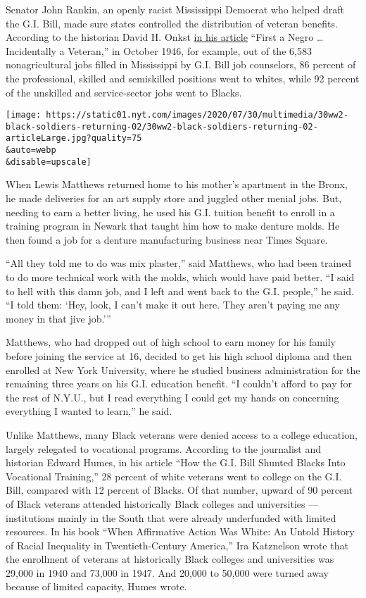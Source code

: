 Senator John Rankin, an openly racist Mississippi Democrat who helped
draft the G.I. Bill, made sure states controlled the distribution of
veteran benefits. According to the historian David H. Onkst
\href{https://www.jstor.org/stable/3789713?seq=1}{in his article}
``First a Negro \ldots{} Incidentally a Veteran,'' in October 1946, for
example, out of the 6,583 nonagricultural jobs filled in Mississippi by
G.I. Bill job counselors, 86 percent of the professional, skilled and
semiskilled positions went to whites, while 92 percent of the unskilled
and service-sector jobs went to Blacks.

\texttt{[image: https://static01.nyt.com/images/2020/07/30/multimedia/30ww2-black-soldiers-returning-02/30ww2-black-soldiers-returning-02-articleLarge.jpg?quality=75\\\&auto=webp\\\&disable=upscale]}

When Lewis Matthews returned home to his mother's apartment in the
Bronx, he made deliveries for an art supply store and juggled other
menial jobs. But, needing to earn a better living, he used his G.I.
tuition benefit to enroll in a training program in Newark that taught
him how to make denture molds. He then found a job for a denture
manufacturing business near Times Square.

``All they told me to do was mix plaster,'' said Matthews, who had been
trained to do more technical work with the molds, which would have paid
better. ``I said to hell with this damn job, and I left and went back to
the G.I. people,'' he said. ``I told them: `Hey, look, I can't make it
out here. They aren't paying me any money in that jive job.'''

Matthews, who had dropped out of high school to earn money for his
family before joining the service at 16, decided to get his high school
diploma and then enrolled at New York University, where he studied
business administration for the remaining three years on his G.I.
education benefit. ``I couldn't afford to pay for the rest of N.Y.U.,
but I read everything I could get my hands on concerning everything I
wanted to learn,'' he said.

Unlike Matthews, many Black veterans were denied access to a college
education, largely relegated to vocational programs. According to the
journalist and historian Edward Humes, in his article ``How the G.I.
Bill Shunted Blacks Into Vocational Training,'' 28 percent of white
veterans went to college on the G.I. Bill, compared with 12 percent of
Blacks. Of that number, upward of 90 percent of Black veterans attended
historically Black colleges and universities --- institutions mainly in
the South that were already underfunded with limited resources. In his
book ``When Affirmative Action Was White: An Untold History of Racial
Inequality in Twentieth-Century America,'' Ira Katznelson wrote that the
enrollment of veterans at historically Black colleges and universities
was 29,000 in 1940 and 73,000 in 1947. And 20,000 to 50,000 were turned
away because of limited capacity, Humes wrote.

